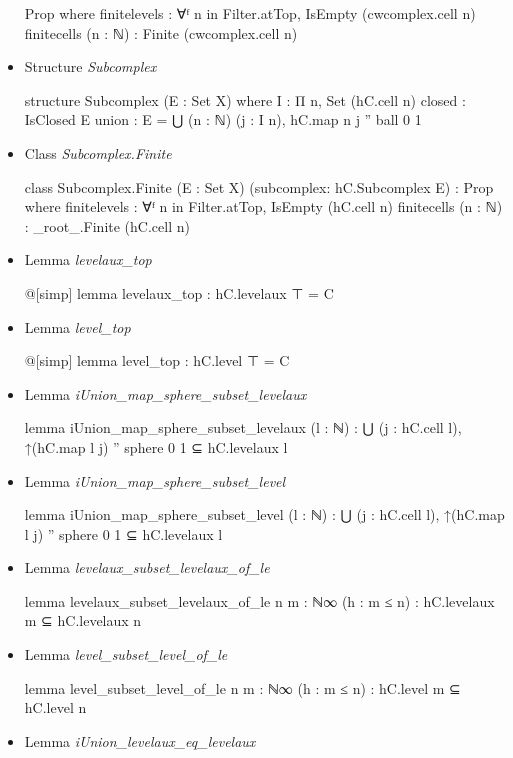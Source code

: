 \documentclass[colorinlistoftodos]{article}
\begin{document}
\begin{itemize}
\begin{leancode}
Prop where
  finitelevels : ∀ᶠ n in Filter.atTop, IsEmpty (cwcomplex.cell n)
  finitecells (n : ℕ) : Finite (cwcomplex.cell n)
\end{leancode}
  \item Structure \emph{Subcomplex}
\begin{leancode}
structure Subcomplex (E : Set X) where
  I : Π n, Set (hC.cell n)
  closed : IsClosed E
  union : E = ⋃ (n : ℕ) (j : I n), hC.map n j '' ball 0 1
\end{leancode}
  \item Class \emph{Subcomplex.Finite}
\begin{leancode}
class Subcomplex.Finite (E : Set X) (subcomplex: hC.Subcomplex E) : Prop where
  finitelevels : ∀ᶠ n in Filter.atTop, IsEmpty (hC.cell n)
  finitecells (n : ℕ) : _root_.Finite (hC.cell n)
\end{leancode}
  \item Lemma \emph{levelaux\_top}
\begin{leancode}
@[simp] lemma levelaux_top : hC.levelaux ⊤ = C
\end{leancode}
  \item Lemma \emph{level\_top}
\begin{leancode}
@[simp] lemma level_top : hC.level ⊤ = C
\end{leancode}
  \item Lemma \emph{iUnion\_map\_sphere\_subset\_levelaux}
\begin{leancode}
lemma iUnion_map_sphere_subset_levelaux (l : ℕ) : 
  ⋃ (j : hC.cell l), ↑(hC.map l j) '' sphere 0 1 ⊆ hC.levelaux l
\end{leancode}
  \item Lemma \emph{iUnion\_map\_sphere\_subset\_level}
\begin{leancode}
lemma iUnion_map_sphere_subset_level (l : ℕ) :
  ⋃ (j : hC.cell l), ↑(hC.map l j) '' sphere 0 1 ⊆ hC.levelaux l
\end{leancode}
  \item Lemma \emph{levelaux\_subset\_levelaux\_of\_le}
\begin{leancode}
lemma levelaux_subset_levelaux_of_le {n m : ℕ∞} (h : m ≤ n) :
  hC.levelaux m ⊆ hC.levelaux n
\end{leancode}
  \item Lemma \emph{level\_subset\_level\_of\_le}
\begin{leancode}
lemma level_subset_level_of_le {n m : ℕ∞} (h : m ≤ n) : hC.level m ⊆ hC.level n
\end{leancode}
  \item Lemma \emph{iUnion\_levelaux\_eq\_levelaux}

\end{itemize}
\end{document}
